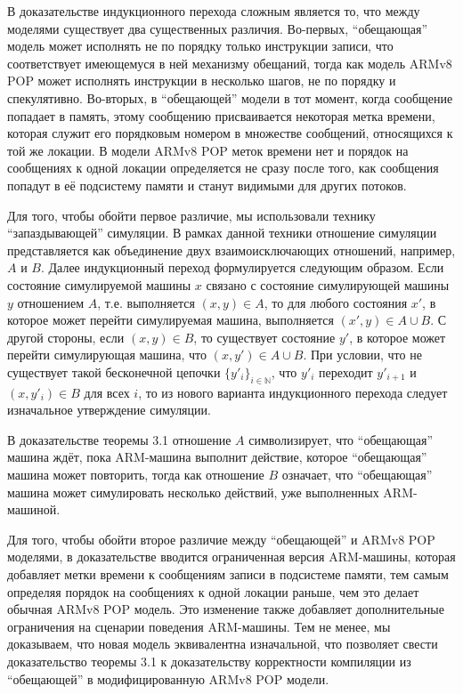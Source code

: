 В доказательстве индукционного перехода сложным является то, что между моделями существует два существенных различия.
Во-первых, ``обещающая'' модель может исполнять не по порядку только инструкции записи, что соответствует имеющемуся в ней механизму обещаний,
тогда как модель ARMv8 POP может исполнять инструкции в несколько шагов, не по порядку и спекулятивно.
Во-вторых, в ``обещающей'' модели в тот момент, когда сообщение попадает в память, этому сообщению присваивается некоторая
метка времени, которая служит его порядковым номером в множестве сообщений, относящихся к той же локации. В модели ARMv8 POP
меток времени нет и порядок на сообщениях к одной локации определяется не сразу после того, как
сообщения попадут в её подсистему памяти и станут видимыми для других потоков.

Для того, чтобы обойти первое различие, мы использовали технику ``запаздывающей'' симуляции. В рамках данной техники отношение
симуляции представляется как объединение двух взаимоисключающих отношений, например, $A$ и $B$. Далее индукционный
переход формулируется следующим образом. Если состояние симулируемой машины $x$ связано с состояние симулирующей машины $y$ отношением $A$,
т.е. выполняется $(x,y) \in A$, то для любого состояния $x'$, в которое может перейти симулируемая машина, выполняется $(x', y) \in A \cup B$.
С другой стороны, если $(x, y) \in B$, то существует состояние $y'$, в которое может перейти симулирующая машина, что $(x, y') \in A \cup B$.
При условии, что не существует такой бесконечной цепочки $\{y'_i\}_{i \in \mathbb{N}}$, что $y'_i$ переходит $y'_{i+1}$ и $(x, y'_i) \in B$ для всех $i$,
то из нового варианта индукционного перехода следует изначальное утверждение симуляции.

В доказательстве теоремы 3.1 отношение $A$ символизирует, что ``обещающая'' машина ждёт, пока ARM-машина выполнит действие, которое ``обещающая''
машина может повторить, тогда как отношение $B$ означает, что ``обещающая'' машина может симулировать несколько действий, уже выполненных ARM-машиной.

Для того, чтобы обойти второе различие между ``обещающей'' и ARMv8 POP моделями, в доказательстве вводится ограниченная версия ARM-машины,
которая добавляет метки времени к сообщениям записи в подсистеме памяти, тем самым определяя порядок на сообщениях к одной локации
раньше, чем это делает обычная ARMv8 POP модель. Это изменение также добавляет дополнительные ограничения на сценарии поведения ARM-машины.
Тем не менее, мы доказываем, что новая модель эквивалентна изначальной, что позволяет свести доказательство теоремы 3.1
к доказательству корректности компиляции из ``обещающей'' в модифицированную ARMv8 POP модели.

